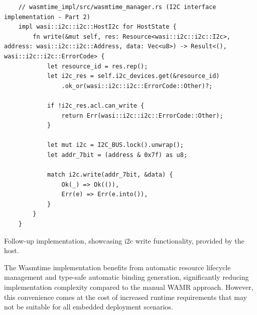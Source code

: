 \begin{listing}[H]
    \begin{verbatim}
    // wasmtime_impl/src/wasmtime_manager.rs (I2C interface implementation - Part 2)
    impl wasi::i2c::i2c::HostI2c for HostState {
        fn write(&mut self, res: Resource<wasi::i2c::i2c::I2c>, address: wasi::i2c::i2c::Address, data: Vec<u8>) -> Result<(), wasi::i2c::i2c::ErrorCode> {
            let resource_id = res.rep();
            let i2c_res = self.i2c_devices.get(&resource_id)
                .ok_or(wasi::i2c::i2c::ErrorCode::Other)?;
    
            if !i2c_res.acl.can_write {
                return Err(wasi::i2c::i2c::ErrorCode::Other);
            }
    
            let mut i2c = I2C_BUS.lock().unwrap();
            let addr_7bit = (address & 0x7f) as u8;
    
            match i2c.write(addr_7bit, &data) {
                Ok(_) => Ok(()),
                Err(e) => Err(e.into()),
            }
        }
    }
    \end{verbatim}
    \caption{Follow-up implementation, showcasing \acrshort{i2c} write functionality, provided by the host.}
    \label{lst:wasmtime-implementation-p2}
\end{listing}

The Wasmtime implementation benefits from automatic resource lifecycle management and type-safe automatic binding generation, significantly reducing implementation complexity compared to the manual WAMR approach. However, this convenience comes at the cost of increased runtime requirements that may not be suitable for all embedded deployment scenarios.